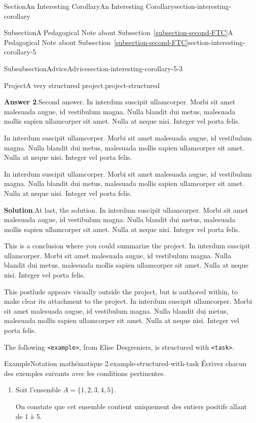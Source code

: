 \documentclass[twoside,10pt,]{article}
\newcommand{\blocktitlefont}{\relax}
\newcommand{\xreffont}{\relax}
\newcommand{\mono}[1]{\texttt{#1}}
\numberwithin{equation}{section}
\begin{document}
\begin{sectionptx}{Section}{An Interesting Corollary}{}{An Interesting Corollary}{}{}{section-interesting-corollary}
\begin{subsectionptx}{Subsection}{A Pedagogical Note about Subsection~{\xreffont\ref*{subsection-second-FTC}}}{}{A Pedagogical Note about Subsection~{\xreffont\ref*{subsection-second-FTC}}}{}{}{section-interesting-corollary-5}
\begin{subsubsectionptx}{Subsubsection}{Advice}{}{Advice}{}{}{section-interesting-corollary-5-3}
\begin{project}{Project}{A very structured project.}{project-structured}
\begin{enumerate}[font=\bfseries,label=(\alph*),ref=\alph*]
\noindent\textbf{\blocktitlefont Answer 2}.\hypertarget{project-structured-7-4}{}\quad{}Second answer.  In interdum suscipit ullamcorper. Morbi sit amet malesuada augue, id vestibulum magna. Nulla blandit dui metus, malesuada mollis sapien ullamcorper sit amet. Nulla at neque nisi. Integer vel porta felis.%
\par
In interdum suscipit ullamcorper. Morbi sit amet malesuada augue, id vestibulum magna. Nulla blandit dui metus, malesuada mollis sapien ullamcorper sit amet. Nulla at neque nisi. Integer vel porta felis.%
\par
In interdum suscipit ullamcorper. Morbi sit amet malesuada augue, id vestibulum magna. Nulla blandit dui metus, malesuada mollis sapien ullamcorper sit amet. Nulla at neque nisi. Integer vel porta felis.%
\par\smallskip%
\noindent\textbf{\blocktitlefont Solution}.\hypertarget{project-structured-7-5}{}\quad{}At last, the solution.  In interdum suscipit ullamcorper. Morbi sit amet malesuada augue, id vestibulum magna. Nulla blandit dui metus, malesuada mollis sapien ullamcorper sit amet. Nulla at neque nisi. Integer vel porta felis.%
\end{enumerate}%
This is a conclusion where you could summarize the project.  In interdum suscipit ullamcorper. Morbi sit amet malesuada augue, id vestibulum magna. Nulla blandit dui metus, malesuada mollis sapien ullamcorper sit amet. Nulla at neque nisi. Integer vel porta felis.%
\end{project}%
\par
This postlude appears visually outside the project, but is authored within, to make clear its attachment to the project.  In interdum suscipit ullamcorper. Morbi sit amet malesuada augue, id vestibulum magna. Nulla blandit dui metus, malesuada mollis sapien ullamcorper sit amet. Nulla at neque nisi. Integer vel porta felis.%
\par
The following \mono{<example>}, from Elise Desgreniers, is structured with \mono{<task>}.%
\begin{example}{Example}{Notation mathématique 2.}{example-structured-with-task}%
Écrivez chacun des exemples suivants avec les conditions pertinentes.%
\begin{enumerate}[font=\bfseries,label=(\alph*),ref=\alph*]%
\item{}Soit l'ensemble \(A=\lbrace 1,2,3,4,5\rbrace\).%
\par
On constate que cet ensemble contient uniquement des entiers positifs allant de 1 à 5.%
\par

\end{enumerate}
\end{example}
\end{subsubsectionptx}
\end{subsectionptx}
\end{sectionptx}
\end{document}
